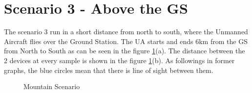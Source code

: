 \section{Scenario 3 - Above the GS}\label{sec:scenario3}
The scenario 3 run in a short distance from north to south, where the Unmanned Aircraft flies over the Ground Station. The UA starts and ends 6km from the GS from North to South as can be seen in the figure \ref{fig:s3_map}(a). The distance between the 2 devices at every sample is shown in the figure \ref{fig:s3_map}(b). As followings in former graphs, the blue circles mean that there is line of sight between them. 


\begin{figure}[H]
	\hfill
	\hfill
	\hfill
	\caption{Mountain Scenario}
	\label{fig:s3_map}
\end{figure}

